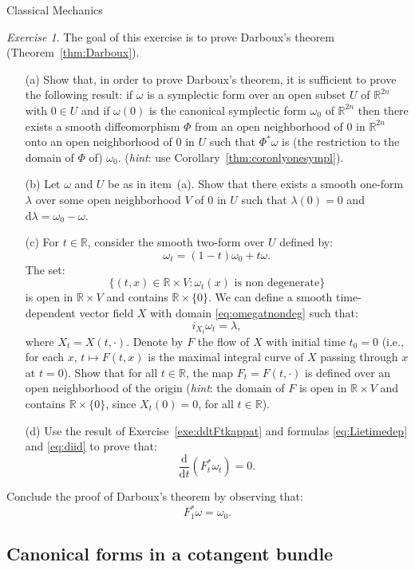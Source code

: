 \documentclass[oneside,a4paper,11pt]{amsbook}
\newcommand{\R}{\mathds R}
\newcommand{\dd}{\mathrm d}
\theoremstyle{remark}\newtheorem{exercise}{Exercise}[chapter]
\theoremstyle{plain}\newtheorem{teo}{Theorem}[section]
\theoremstyle{plain}\newtheorem{lem}[teo]{Lemma}
\theoremstyle{plain}\newtheorem{prop}[teo]{Proposition}
\theoremstyle{plain}\newtheorem{cor}[teo]{Corollary}
\theoremstyle{definition}\newtheorem{defin}[teo]{Definition}
\theoremstyle{remark}\newtheorem{rem}[teo]{Remark}
\theoremstyle{definition}\newtheorem{notation}[teo]{Notation}
\theoremstyle{definition}\newtheorem{convention}[teo]{Convention}
\theoremstyle{definition}\newtheorem{example}[teo]{Example}
\numberwithin{section}{chapter}
\numberwithin{equation}{section}
\begin{document}
\begin{chapter}{Classical Mechanics}
\begin{exercise}\label{exe:Darboux}
The goal of this exercise is to prove Darboux's theorem (Theorem~\ref{thm:Darboux}).
\begin{itemize}
\item[(a)] Show that, in order to prove Darboux's theorem, it is sufficient to prove the following result: if $\omega$
is a symplectic form over an open subset $U$ of $\R^{2n}$ with $0\in U$ and if $\omega(0)$ is the canonical symplectic form
$\omega_0$ of $\R^{2n}$ then there exists a smooth diffeomorphism
$\Phi$ from an open neighborhood of $0$ in $\R^{2n}$ onto an open neighborhood of $0$ in $U$ such that $\Phi^*\omega$
is (the restriction to the domain of $\Phi$ of) $\omega_0$. ({\em hint}: use Corollary~\ref{thm:coronlyonesympl}).
\item[(b)] Let $\omega$ and $U$ be as in item~(a). Show that there exists a smooth one-form $\lambda$ over some open
neighborhood $V$ of $0$ in $U$ such that $\lambda(0)=0$ and $\dd\lambda=\omega_0-\omega$.
\item[(c)] For $t\in\R$, consider the smooth two-form over $U$ defined by:
\[\omega_t=(1-t)\omega_0+t\omega.\]
The set:
\begin{equation}\label{eq:omegatnondeg}
\big\{(t,x)\in\R\times V:\text{$\omega_t(x)$ is non degenerate}\!\big\}
\end{equation}
is open in $\R\times V$ and contains $\R\times\{0\}$. We can define a smooth time-dependent vector field
$X$ with domain \eqref{eq:omegatnondeg} such that:
\[i_{X_t}\omega_t=\lambda,\]
where $X_t=X(t,\cdot)$.
Denote by $F$ the flow of $X$ with initial time $t_0=0$ (i.e., for each $x$, $t\mapsto F(t,x)$ is the maximal integral curve of $X$ passing through $x$
at $t=0$).
Show that for all $t\in\R$, the map $F_t=F(t,\cdot)$ is defined over an open neighborhood of the origin ({\em hint}:
the domain of $F$ is open in $\R\times V$ and contains $\R\times\{0\}$, since $X_t(0)=0$, for all $t\in\R$).
\item[(d)] Use the result of Exercise~\ref{exe:ddtFtkappat} and formulas \eqref{eq:Lietimedep} and \eqref{eq:diid} to prove that:
\[\frac{\dd}{\dd t}(F_t^*\omega_t)=0.\]
\end{itemize}
\smallskip
Conclude the proof of Darboux's theorem by observing that:
\[F_1^*\omega=\omega_0.\]
\end{exercise}

\subsection*{Canonical forms in a cotangent bundle}


\end{chapter}
\end{document}
